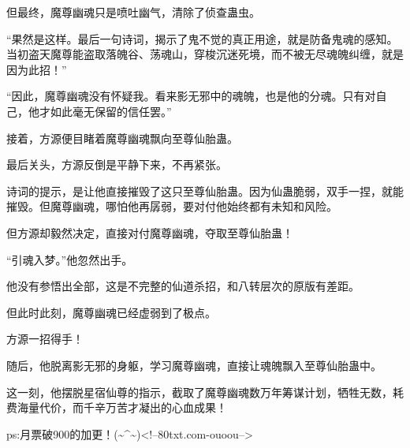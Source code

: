\begin{this_body}
但最终，魔尊幽魂只是喷吐幽气，清除了侦查蛊虫。

“果然是这样。最后一句诗词，揭示了鬼不觉的真正用途，就是防备鬼魂的感知。当初盗天魔尊能盗取落魄谷、荡魂山，穿梭沉迷死境，而不被无尽魂魄纠缠，就是因为此招！”

“因此，魔尊幽魂没有怀疑我。看来影无邪中的魂魄，也是他的分魂。只有对自己，他才如此毫无保留的信任罢。”

接着，方源便目睹着魔尊幽魂飘向至尊仙胎蛊。

最后关头，方源反倒是平静下来，不再紧张。

诗词的提示，是让他直接摧毁了这只至尊仙胎蛊。因为仙蛊脆弱，双手一捏，就能摧毁。但魔尊幽魂，哪怕他再孱弱，要对付他始终都有未知和风险。

但方源却毅然决定，直接对付魔尊幽魂，夺取至尊仙胎蛊！

“引魂入梦。”他忽然出手。

他没有参悟出全部，这是不完整的仙道杀招，和八转层次的原版有差距。

但此时此刻，魔尊幽魂已经虚弱到了极点。

方源一招得手！

随后，他脱离影无邪的身躯，学习魔尊幽魂，直接让魂魄飘入至尊仙胎蛊中。

这一刻，他摆脱星宿仙尊的指示，截取了魔尊幽魂数万年筹谋计划，牺牲无数，耗费海量代价，而千辛万苦才凝出的心血成果！

ps:月票破900的加更！(\~{}\^{}\~{})<!--80txt.com-ouoou-->

\end{this_body}

